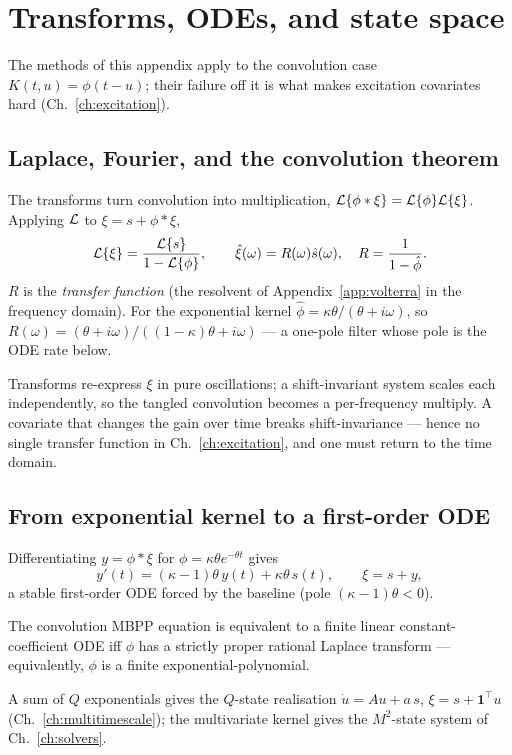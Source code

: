 \chapter{Transforms, ODEs, and state space}
\label{app:transforms}

The methods of this appendix apply to the convolution case $K(t,u)=\phi(t-u)$; their
failure off it is what makes excitation covariates hard (Ch.~\ref{ch:excitation}).

\section{Laplace, Fourier, and the convolution theorem}

The transforms turn convolution into multiplication,
$\mathcal{L}\{\phi*\xi\}=\mathcal{L}\{\phi\}\mathcal{L}\{\xi\}$. Applying $\mathcal{L}$ to $\xi=s+\phi*\xi$,
\begin{equation}
\mathcal{L}\{\xi\}=\frac{\mathcal{L}\{s\}}{1-\mathcal{L}\{\phi\}},\qquad
\hat\xi(\omega)=R(\omega)\hat s(\omega),\quad R=\frac{1}{1-\hat\phi}.
\end{equation}
$R$ is the \emph{transfer function} (the resolvent of Appendix~\ref{app:volterra} in
the frequency domain). For the exponential kernel $\hat\phi=\kappa\theta/(\theta+i\omega)$,
so $R(\omega)=(\theta+i\omega)/((1-\kappa)\theta+i\omega)$ --- a one-pole filter
whose pole is the ODE rate below.

\begin{intuitionbox}
Transforms re-express $\xi$ in pure oscillations; a shift-invariant system scales
each independently, so the tangled convolution becomes a per-frequency multiply. A
covariate that changes the gain over time breaks shift-invariance --- hence no single
transfer function in Ch.~\ref{ch:excitation}, and one must return to the time domain.
\end{intuitionbox}

\section{From exponential kernel to a first-order ODE}

Differentiating $y=\phi*\xi$ for $\phi=\kappa\theta e^{-\theta t}$ gives
\begin{equation}
y'(t)=(\kappa-1)\theta\,y(t)+\kappa\theta\,s(t),\qquad \xi=s+y,
\end{equation}
a stable first-order ODE forced by the baseline (pole $(\kappa-1)\theta<0$).

\begin{theorem}[realisation]\label{thm:appode-rational}
The convolution MBPP equation is equivalent to a finite linear constant-coefficient
ODE iff $\phi$ has a strictly proper rational Laplace transform --- equivalently,
$\phi$ is a finite exponential-polynomial.
\end{theorem}
A sum of $Q$ exponentials gives the $Q$-state realisation
$\dot u=Au+a\,s$, $\xi=s+\mathbf 1^\top u$ (Ch.~\ref{ch:multitimescale}); the
multivariate kernel gives the $M^2$-state system of Ch.~\ref{ch:solvers}.

